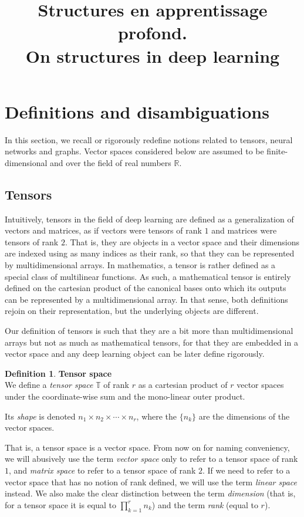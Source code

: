 \documentclass{article}
\title{Structures en apprentissage profond.\\ On structures in deep learning}
\theoremstyle{definition}
\newtheorem{definition}{Definition}[section]
\newcommand{\real}{\mathbb{R}}
\newcommand{\tspace}{\mathbb{T}}
\begin{document}
\section{Definitions and disambiguations}

In this section, we recall or rigorously redefine notions related to tensors, neural networks and graphs. Vector spaces considered below are assumed to be finite-dimensional and over the field of real numbers $\real$.

\subsection{Tensors}

Intuitively, tensors in the field of deep learning are defined as a generalization of vectors and matrices, as if vectors were tensors of rank $1$ and matrices were tensors of rank $2$. That is, they are objects in a vector space and their dimensions are indexed using as many indices as their rank, so that they can be represented by multidimensional arrays. In mathematics, a tensor is rather defined as a special class of multilinear functions. As such, a mathematical tensor is entirely defined on the cartesian product of the canonical bases onto which its outputs can be represented by a multidimensional array. In that sense, both definitions rejoin on their representation, but the underlying objects are different.

Our definition of tensors is such that they are a bit more than multidimensional arrays but not as much as mathematical tensors, for that they are embedded in a vector space and any deep learning object can be later define rigorously.

\begin{definition}\textbf{Tensor space}\\
We define a \emph{tensor space} $\tspace$ of rank $r$ as a cartesian product of $r$ vector spaces under the coordinate-wise sum and the mono-linear outer product.

Its \emph{shape} is denoted $n_1 \times n_2 \times \cdots \times n_r$, where the $\{n_k\}$ are the dimensions of the vector spaces.
\end{definition}

That is, a tensor space is a vector space. From now on for naming conveniency, we will abusively use the term \emph{vector space} only to refer to a tensor space of rank $1$, and \emph{matrix space} to refer to a tensor space of rank $2$. If we need to refer to a vector space that has no notion of rank defined, we will use the term \emph{linear space} instead.
We also make the clear distinction between the term \emph{dimension} (that is, for a tensor space it is equal to $\displaystyle \prod_{k=1}^r n_k$) and the term \emph{rank} (equal to $r$).
\end{document}
